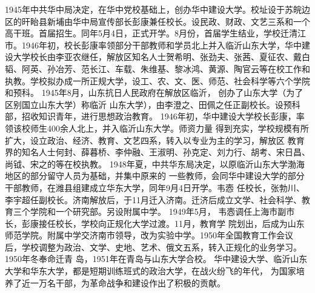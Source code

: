 \documentclass[openany]{sduthesis} %
\begin{document}
1945年中共华中局决定，在华中党校基础上，创办华中建设大学。校址设于苏皖边区的旰眙县新埔由华中局宣传部长彭康兼任校长。设民政、财政、文艺三系和一个高干班。首届招生。同年5月4日，正式开学。8月份，首届学生结业，学校迁清江市。1946年初，校长彭康率领部分干部教师和学员北上并入临沂山东大学，华中建设大学校长由李亚农继任，解放区知名人士贺希明、张劲夫、张茜、夏征农、戴白韬、阿英、孙冶芳、范长江、车载、朱维基、黎冰鸿、黄源、陶官云等在校工作和执教。学校拟办成一所正规大学，设工、农、文、医、师范、社会科学等六个学院和预科。 1945年8月，山东抗日人民政府在解放区临沂， 创办了山东大学（为了区别国立山东大学）称临沂 山东大学），由李澄之、田佩之任正副校长。设预科部，招收知识青年，进行思想政治教育。 1946年初，华中建设大学校长彭康，率领该校师生400余人北上，并入临沂山东大学。师资力量 得到充实，学校规模有所扩大，设立政治、经济、教育、文艺四系，转入以专业为主的学习，解放区 教育界的知名人士何封、薛暮桥、李仲融、王淑明、孙克定、刘力行、胡考、宋日昌、尚钺、宋之的等在校执教。 1948年夏，中共华东局决定，以原临沂山东大学渤海地区的部分留守人员为基础，并集中原来的 一些教师，会同华中建设大学的部分干部教师，在潍县组建成立华东大学，同年9月4日开学。韦悫 任校长，张勃川、李宇超任副校长。济南解放后，于11月迁入济南。迁济后成立文学、社会科学、教 育三个学院和一个研究部。另设附属中学。 1949年5月， 韦悫调任上海市副市长，彭康接任校长，学校向正规化大学过渡。11月，教育学 院划出，后成为山东师范学院。附属中学交济南市领导，改为实验中学。1950年全国教育工作会议 后，学校调整为政治、文学、史地、艺术、俄文五系，转入正规化的业务学习。1950年冬奉命迁青 岛，1951年在青岛与山东大学合校。 华中建设大学、临沂山东大学和华东大学，都是短期训练班式的政治大学，在战火纷飞的年代， 为国家培养了近一万名干部，为革命战争和建设作出了积极的贡献。
\end{document}
